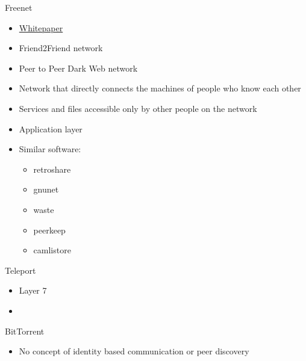 \hypertarget{notes__02140-freenet.md}{}
\begin{block}{Freenet}
\protect\hypertarget{notes__02140-freenet.md__freenet}{}
\begin{itemize}
\tightlist
\item
  \href{https://homepage.divms.uiowa.edu/~ghosh/freenet.pdf}{Whitepaper}
\item
  Friend2Friend network
\item
  Peer to Peer Dark Web network
\item
  Network that directly connects the machines of people who know each
  other
\item
  Services and files accessible only by other people on the network
\item
  Application layer
\item
  Similar software:

  \begin{itemize}
  \tightlist
  \item
    retroshare
  \item
    gnunet
  \item
    waste
  \item
    peerkeep
  \item
    camlistore
  \end{itemize}
\end{itemize}
\end{block}

\hypertarget{notes__02150-teleport.md}{}
\begin{block}{Teleport}
\protect\hypertarget{notes__02150-teleport.md__teleport}{}
\begin{itemize}
\tightlist
\item
  Layer 7
\item
\end{itemize}
\end{block}

\hypertarget{notes__02160-bittorrent.md}{}
\begin{block}{BitTorrent}
\protect\hypertarget{notes__02160-bittorrent.md__bittorrent}{}
\begin{itemize}
\tightlist
\item
  No concept of identity based communication or peer discovery
\end{itemize}
\end{block}

